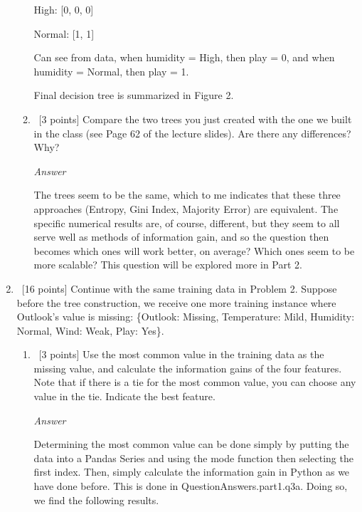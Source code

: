 \documentclass[12pt, fullpage,letterpaper]{article}
\begin{document}
\begin{enumerate}
\begin{enumerate}
    \vspace{5mm}
    
    High: [0, 0, 0]
    
    Normal: [1, 1]

    \vspace{5mm}
    
    Can see from data, when humidity = High, then play = 0, and when humidity = Normal, then play = 1.
    
    \vspace{5mm}
    
    Final decision tree is summarized in Figure 2.
	
	\item~[3 points] Compare the two trees you just created with the one we built in the class (see Page 62 of the lecture slides). Are there any differences? Why?
	
	\emph{Answer}
	
	The trees seem to be the same, which to me indicates that these three approaches (Entropy, Gini Index, Majority Error) are equivalent. The specific numerical results are, of course, different, but they seem to all serve well as methods of information gain, and so the question then becomes which ones will work better, on average? Which ones seem to be more scalable? This question will be explored more in Part 2.
	
\end{enumerate}

\item~[16 points] Continue with the same training data in Problem 2. Suppose before the tree construction, we receive one more training instance where Outlook's value is missing: \{Outlook: Missing, Temperature: Mild, Humidity: Normal, Wind: Weak, Play: Yes\}. 

\begin{enumerate}
\item~[3 points] Use the most common value in the training data as the missing  value, and calculate the information gains of the four features. Note that if there is a tie for the most common value, you can choose any value in the tie.  Indicate the best feature. 

\emph{Answer}

Determining the most common value can be done simply by putting the data into a Pandas Series and using the mode function then selecting the first index. Then, simply calculate the information gain in Python as we have done before. This is done in QuestionAnswers.part1.q3a. Doing so, we find the following results.


\end{enumerate}
\end{enumerate}
\end{document}
